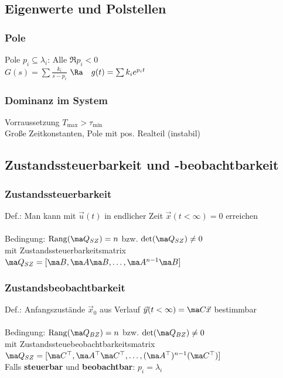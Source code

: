 \documentclass[german]{latex4ei/latex4ei_sheet}
\begin{document}
\begin{sectionbox}
\subsection{Eigenwerte und Polstellen}

	\subsubsection{Pole}
	Pole $p_i \subseteq \lambda_i$: Alle $\Re{p_i} < 0$ \\
	$G(s) = \sum \frac{k_i}{s-p_i}$ \qquad $\Ra \quad g(t) = \sum k_i e^{p_i t}$ \\
	
	\subsubsection{Dominanz im System}
	Vorraussetzung $T_{\max} > \tau_{\min}$\\
	Große Zeitkonstanten, Pole mit pos. Realteil (instabil)
\end{sectionbox}

\begin{sectionbox}
\subsection{Zustandssteuerbarkeit und -beobachtbarkeit}

	\subsubsection{Zustandssteuerbarkeit}
		Def.: Man kann mit $\vec u(t)$ in endlicher Zeit $\vec x(t < \infty) = 0$ erreichen\\\\
		Bedingung: $\mathrm {Rang}(\ma Q_{SZ})=n$ bzw. $\det(\ma Q_{SZ})\ne 0$ \\
		mit Zustandssteuerbarkeitsmatrix $\ma Q_{SZ}=[\ma B, \ma A \ma B, \ldots, \ma A^{n-1} \ma B]$

	\subsubsection{Zustandsbeobachtbarkeit}
		Def.: Anfangszustände $\vec x_0$ aus Verlauf $\vec y(t < \infty)=\ma C \vec x$ bestimmbar \\\\
		Bedingung: $\mathrm {Rang}(\ma Q_{BZ})=n$ bzw.  $\det(\ma Q_{BZ})\ne 0$ \\
		mit Zustandssteuebeobachtbarkeitsmatrix\\ $\ma Q_{SZ} = [\ma C^\top, \ma A^\top \ma C^\top, \ldots, (\ma A^\top)^{n-1} (\ma C^\top)]$\\
	Falls \textbf{steuerbar} und \textbf{beobachtbar}: $p_i = \lambda_i$
\end{sectionbox}
\end{document}
